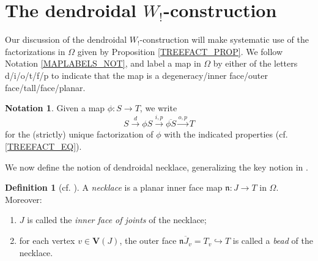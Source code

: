 \documentclass[a4paper,10pt
,draft
]{article}%
\numberwithin{equation}{section}
\numberwithin{figure}{section}
\theoremstyle{definition} %
\newtheorem{definition}[equation]{Definition}%
\newtheorem{notation}[equation]{Notation}%
\newcommand{\1}{\ensuremath{\mathbbm 1}}%
\begin{document}
\section{The dendroidal $W_!$-construction}
\label{WCONS AP}


Our discussion of the dendroidal $W_!$-construction
will make systematic
use of the factorizations in $\Omega$ given by 
Proposition \ref{TREEFACT_PROP}.
We follow Notation \ref{MAPLABELS_NOT},
and label 
a map in $\Omega$
by either of the letters d/i/o/t/f/p
to indicate that the map is
a degeneracy/inner face/outer face/tall/face/planar.

\begin{notation}\label{UNIQFACT NOT}
        Given a map $\phi\colon S \to T$,
        we write
        \[
                S \xrightarrow{d}
                \phi S \xrightarrow{i,p}
                \overline{\phi S} \xrightarrow{o,p}
                T
        \]
        for the (strictly) unique 
        factorization of $\phi$ with the indicated properties
        (cf. \ref{TREEFACT_EQ}).
\end{notation}


We now define the notion of dendroidal necklace,
generalizing the key notion in \cite{DS11}.
 

\begin{definition}[{cf. \cite[\S 3]{DS11}}]
        \label{NECKLACE_DEF}
	A \emph{necklace} is 
	a planar inner face map
	$\mathfrak{n} \colon J \to T$
	in $\Omega$.
	Moreover:
	\begin{enumerate}[label = (\roman*)]
		\item 
		$J$ is called the \emph{inner face of joints} of the necklace;
		\item for each vertex $v \in \boldsymbol{V}(J)$,
		the outer face
		$\overline{\mathfrak{n} J_v} = T_v \hookrightarrow T$
		is called a \emph{bead} of the necklace.
	\end{enumerate}
\end{definition}
\end{document}

